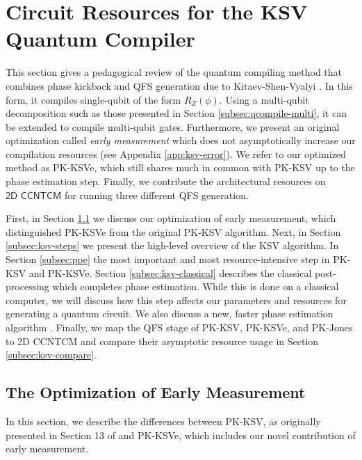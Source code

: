 \section{Circuit Resources for the KSV Quantum Compiler}
\label{sec:qcompile-ksv}

This section gives a pedagogical review of the quantum compiling method
that combines phase kickback and QFS generation due to
Kitaev-Shen-Vyalyi \cite{Kitaev2002}. In this form, it compiles single-qubit
of the form $R_Z(\phi)$. Using a multi-qubit
decomposition such as those presented in Section \ref{subsec:qcompile-multi},
it can be extended to compile multi-qubit gates.
Furthermore, we present an
original optimization
called \emph{early measurement} which does not asymptotically increase
our compilation resources (see Appendix \ref{app:ksv-error}). We refer to
our optimized method as PK-KSVe, which still shares much in common with
PK-KSV up to the phase estimation step.
Finally, we contribute the architectural resources on $\textsf{2D CCNTCM}$ for running 
three different QFS generation.

First, in Section \ref{subsec:ksv-diff} we discuss our optimization of early measurement, which distinguished
PK-KSVe from the original PK-KSV algorithm.
Next,
in Section \ref{subsec:ksv-steps} we present the high-level overview
of the KSV algorithm. In Section \ref{subsec:ppe} the most important
and most resource-intensive step in PK-KSV and PK-KSVe.
Section \ref{subsec:ksv-classical} describes the classical post-processing
which completes phase estimation. While this is done on a classical computer,
we will discuss how this step affects our parameters and resources
for generating a quantum circuit. We also discuss a new, faster
phase estimation algorithm \cite{Svore2013}. Finally, we map the QFS
stage of PK-KSV,
PK-KSVe, and PK-Jones to \textsf{2D CCNTCM} and compare their
asymptotic resource usage in Section \ref{subsec:ksv-compare}.

\subsection{The Optimization of Early Measurement}
\label{subsec:ksv-diff}

In this section, we describe the differences between PK-KSV, as originally
presented in Section 13 of \cite{Kitaev2002} and PK-KSVe, which includes our
novel contribution of early measurement.


